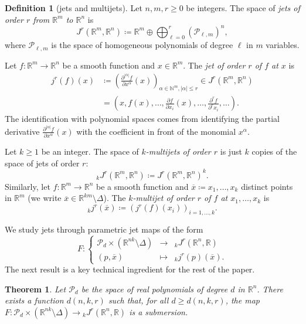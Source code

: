 \documentclass{amsart}
\newcommand{\R}{\mathbb{R}}
\newcommand{\N}{\mathbb{N}}
\newcommand{\Poly}{\mathscr{P}}
\newtheorem{theorem}[subsubsection]{Theorem}
\theoremstyle{definition}
\newtheorem{definition}[subsubsection]{Definition}
\theoremstyle{remark}
\begin{document}
\begin{definition}[jets and multijets]
Let $n, m, r \geq 0$ be integers. The space of \emph{jets of order $r$ from $\R^m$ to $\R^n$} is
\[
J^r(\R^m, \R^n) \coloneqq \R^m \oplus \bigoplus_{\ell = 0}^r (\Poly_{\ell, m})^n,
\]
where $\Poly_{\ell, m}$ is the space of homogeneous polynomials of degree $\ell$ in $m$ variables.

Let $f \colon \R^m \to \R^n$ be a smooth function and $x \in \R^m$. The \emph{jet of order $r$ of $f$ at $x$} is
\begin{align}
j^r(f)(x) & \coloneqq \left( \frac{\partial^{|\alpha|} f}{\partial x^\alpha}(x) \right)_{\alpha \in \N^m, |\alpha| \leq r} \in J^r(\R^m, \R^n) \\
& = \left(x, f(x), \ldots, \frac{\partial f}{\partial x_i}(x), \ldots, \frac{\partial^r f}{\partial^r x_i}, \ldots \right).
\end{align}
The identification with polynomial spaces comes from identifying the partial derivative $\frac{\partial^{|\alpha|} f}{\partial x^\alpha}(x)$ with the coefficient in front of the monomial $x^\alpha$.

Let $k \geq 1$ be an integer. The space of \emph{$k$-multijets of order $r$} is just $k$ copies of the space of jets of order $r$:
\[
{}_k J^r(\R^m, \R^n) \coloneqq J^r(\R^m, \R^n)^k.
\]
Similarly, let $f \colon \R^m \to \R^n$ be a smooth function and $\overline{x} \coloneqq x_1, \ldots, x_k$ distinct points in $\R^m$ (we write $\overline{x} \in \R^{km} \setminus \Delta$). The \emph{$k$-multijet of order $r$ of $f$ at $x_1, \ldots, x_k$} is
\[
{}_k j^r(\overline{x}) \coloneqq (j^r(f)(x_i))_{i = 1, \ldots, k}.
\]
\end{definition}


We study jets through parametric jet maps of the form
\[
F \colon \left\{ \begin{array}{ccc}
\Poly_d \times (\R^{nk} \setminus \Delta) & \to & {}_k J^r(\R^n, \R) \\
(p, \overline{x}) & \mapsto & {}_k j^r(p)(\overline x).
\end{array} \right.
\]
The next result is a key technical ingredient for the rest of the paper.
\begin{theorem}
\label{L:submersion}
Let $\Poly_d$ be the space of real polynomials of degree $d$ in $\R^n$. There exists a function $d(n, k, r)$ such that, for all $d \geq d(n, k, r)$, the map $F \colon \Poly_d \times (\R^{nk} \setminus \Delta) \to {}_k J^r(\R^n, \R)$ is a submersion.
\end{theorem}
\end{document}
